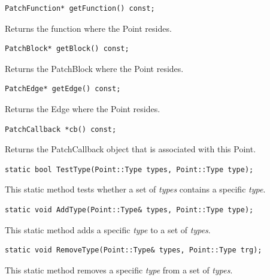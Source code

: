 \documentclass[11pt]{article}
\begin{document}
\begin{verbatim}
PatchFunction* getFunction() const;

\end{verbatim}



Returns the function where the Point resides.


\begin{verbatim}
PatchBlock* getBlock() const;

\end{verbatim}



Returns the PatchBlock where the Point resides.


\begin{verbatim}
PatchEdge* getEdge() const;

\end{verbatim}



Returns the Edge where the Point resides.


\begin{verbatim}
PatchCallback *cb() const;

\end{verbatim}



Returns the PatchCallback object that is associated with this Point.


\begin{verbatim}
static bool TestType(Point::Type types, Point::Type type);

\end{verbatim}



This static method tests whether a set of \emph{types} contains a specific \emph{type}.


\begin{verbatim}
static void AddType(Point::Type& types, Point::Type type);

\end{verbatim}



This static method adds a specific \emph{type} to a set of \emph{types}.


\begin{verbatim}
static void RemoveType(Point::Type& types, Point::Type trg);

\end{verbatim}



This static method removes a specific \emph{type} from a set of \emph{types}.
\end{document}
